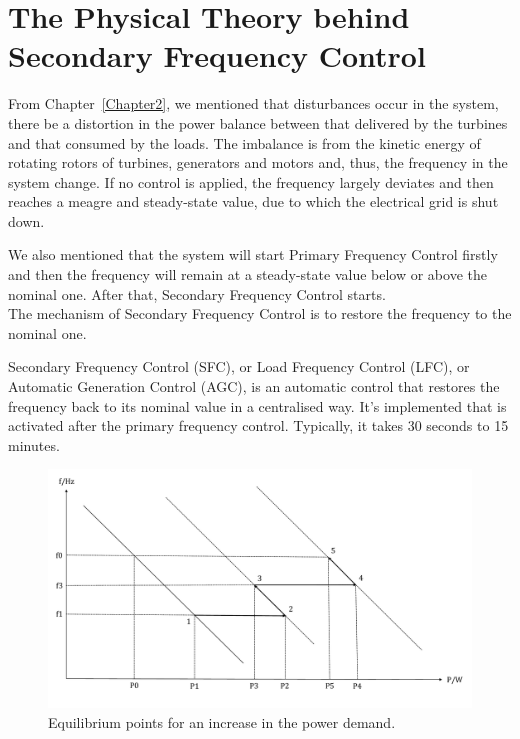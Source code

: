 \section{The Physical Theory behind Secondary Frequency Control} %

From Chapter~\ref{Chapter2}, we mentioned that disturbances occur in the system, there be a distortion in the power balance between that delivered by the turbines and that consumed by the loads. The imbalance is from the kinetic energy of rotating rotors of turbines, generators and motors and, thus, the frequency in the system change. If no control is applied, the frequency largely deviates and then reaches a meagre and steady-state value, due to which the electrical grid is shut down.  

We also mentioned that the system will start Primary Frequency Control firstly and then the frequency will remain at a steady-state value below or above the nominal one. After that, Secondary Frequency Control starts.\\

The mechanism of Secondary Frequency Control is to restore the frequency to the nominal one. 

Secondary Frequency Control (SFC), or Load Frequency Control (LFC), or Automatic Generation Control (AGC), is an automatic control that restores the frequency back to its nominal value in a centralised way. It's implemented that is activated after the primary frequency control. Typically, it takes 30 seconds to 15 minutes. 

\begin{figure}[t]
\center
\includegraphics[scale=0.4]{figure/3_1_Equilibrium.pdf}
\caption{Equilibrium points for an increase in the power demand.}
\label{3_1_Equilibrium}
\end{figure}

